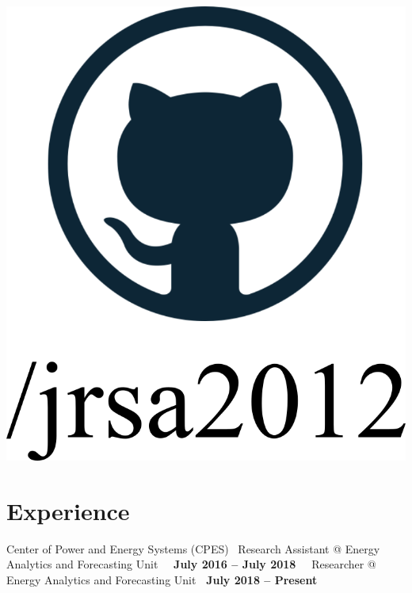 \documentclass{mycv}
\begin{document}
\begin{center}
	\href{https://github.com/jrsa2012}{\includegraphics[scale=0.06]{figs/github_logo_label.png}}
	
\end{center}


\section{Experience}


{Center of Power and Energy Systems (CPES) }
{\textbullet~Research Assistant \hspace{0.005cm} @ \hspace{0.02cm} Energy Analytics and Forecasting Unit \hfill ~\textbf{\ July 2016 -- July 2018\ }}
{\textbullet~Researcher \hspace{1.23cm}  @ \hspace{0.02cm} Energy Analytics and Forecasting Unit \hfill \textbf{ \ July 2018 -- Present\ }}


\vspace{0.4cm}
\end{document}
